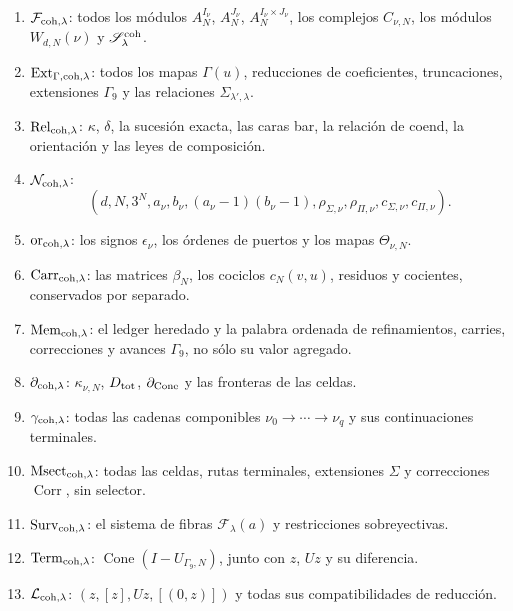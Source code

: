 \begin{enumerate}
 \item \(\mathcal F_{{\rm coh},\lambda}\): todos los módulos
       \(A_N^{I_\nu}\), \(A_N^{J_\nu}\),
       \(A_N^{I_\nu\times J_\nu}\), los complejos \(C_{\nu,N}\), los
       módulos \(W_{d,N}(\nu)\) y \(\mathscr S_\lambda^{\rm coh}\).
 \item \(\operatorname{Ext}_{\Gamma,{\rm coh},\lambda}\): todos los mapas
       \(\Gamma(u)\), reducciones de coeficientes, truncaciones, extensiones
       \(\Gamma_9\) y las relaciones \(\Sigma_{\lambda',\lambda}\).
 \item \(\operatorname{Rel}_{{\rm coh},\lambda}\):
       \(\kappa\), \(\delta\), la sucesión exacta, las caras bar, la
       relación de coend, la orientación y las leyes de composición.
 \item \(\mathcal N_{{\rm coh},\lambda}\):
       \[
       (d,N,3^N,a_\nu,b_\nu,(a_\nu-1)(b_\nu-1),
       \rho_{\Sigma,\nu},\rho_{\Pi,\nu},c_{\Sigma,\nu},c_{\Pi,\nu}).
       \]
 \item \(\operatorname{or}_{{\rm coh},\lambda}\): los signos
       \(\epsilon_\nu\), los órdenes de puertos y los mapas
       \(\Theta_{\nu,N}\).
 \item \(\operatorname{Carr}_{{\rm coh},\lambda}\): las matrices
       \(\beta_N\), los cociclos \(c_N(v,u)\), residuos y cocientes,
       conservados por separado.
 \item \(\operatorname{Mem}_{{\rm coh},\lambda}\): el ledger heredado y la
       palabra ordenada de refinamientos, carries, correcciones y avances
       \(\Gamma_9\), no sólo su valor agregado.
 \item \(\partial_{{\rm coh},\lambda}\):
       \(\kappa_{\nu,N}\), \(D_{\rm tot}\),
       \(\partial_{\rm Cone}\) y las fronteras de las celdas.
 \item \(\gamma_{{\rm coh},\lambda}\): todas las cadenas componibles
       \(\nu_0\to\cdots\to\nu_q\) y sus continuaciones terminales.
 \item \(\operatorname{Msect}_{{\rm coh},\lambda}\): todas las celdas,
       rutas terminales, extensiones \(\Sigma\) y correcciones
       \(\operatorname{Corr}\), sin selector.
 \item \(\operatorname{Surv}_{{\rm coh},\lambda}\): el sistema de fibras
       \(\mathscr F_\lambda(a)\) y restricciones sobreyectivas.
 \item \(\operatorname{Term}_{{\rm coh},\lambda}\):
       \(\operatorname{Cone}(I-U_{\Gamma_9,N})\), junto con \(z\), \(Uz\)
       y su diferencia.
 \item \(\mathcal L_{{\rm coh},\lambda}\):
       \((z,[z],Uz,[(0,z)])\) y todas sus compatibilidades de reducción.
\end{enumerate}

